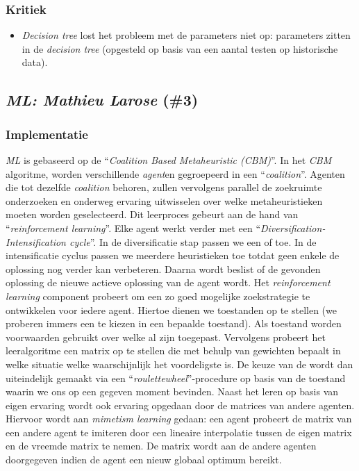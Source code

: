 \subsubsection{Kritiek}
\begin{itemize}
 \item \emph{Decision tree} lost het probleem met de parameters niet op: parameters zitten in de \emph{decision tree} (opgesteld op basis van een aantal testen op historische data).
\end{itemize}
\subsection{\emph{ML: Mathieu Larose} (\#3)}
\label{sss:ml}
\subsubsection{Implementatie}
\emph{ML}\cite{chesc-ml} is gebaseerd op de \abmh{} ``\emph{Coalition Based Metaheuristic (CBM)}''\cite{chesc-ml2}. In het \emph{CBM} algoritme, worden verschillende \emph{agent}en gegroepeerd in een ``\emph{coalition}''. Agenten die tot dezelfde \emph{coalition} behoren, zullen vervolgens parallel de zoekruimte onderzoeken en onderweg ervaring uitwisselen over welke metaheuristieken moeten worden geselecteerd. Dit leerproces gebeurt aan de hand van ``\emph{reinforcement learning}''\cite{rlaiacaml}. Elke agent werkt verder met een ``\emph{Diversification-Intensification cycle}''. In de diversificatie stap passen we een \abmt{} of \abrr{} \abllh{} toe. In de intensificatie cyclus passen we meerdere \abls{} heuristieken toe totdat geen enkele \abls{} \abh{} de oplossing nog verder kan verbeteren. Daarna wordt beslist of de gevonden oplossing de nieuwe actieve oplossing van de agent wordt. Het \emph{reinforcement learning} component probeert om een zo goed mogelijke zoekstrategie te ontwikkelen voor iedere agent. Hiertoe dienen we toestanden op te stellen (we proberen immers een \abh{} te kiezen in een bepaalde toestand). Als toestand worden voorwaarden gebruikt over welke \abllhn{} al zijn toegepast. Vervolgens probeert het leeralgoritme een matrix op te stellen die met behulp van gewichten bepaalt in welke situatie welke \abh{} waarschijnlijk het voordeligste is. De keuze van de \abh{} wordt dan uiteindelijk gemaakt via een ``\emph{roulettewheel}''-procedure\cite{DBLP:journals/corr/abs-1109-3627} op basis van de toestand waarin we ons op een gegeven moment bevinden. Naast het leren op basis van eigen ervaring wordt ook ervaring opgedaan door de matrices van andere agenten. Hiervoor wordt aan \emph{mimetism learning}\cite{655072} gedaan: een agent probeert de matrix van een andere agent te imiteren door een lineaire interpolatie tussen de eigen matrix en de vreemde matrix te nemen. De matrix wordt aan de andere agenten doorgegeven indien de agent een nieuw globaal optimum bereikt.
